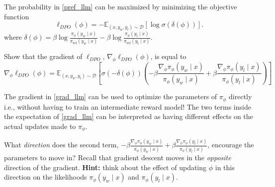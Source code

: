 \documentclass[11pt,addpoints,answers]{exam}
\begin{document}
\begin{questions}
\begin{parts}
\begin{subparts}
    \begin{answer_box}[title=,height=12cm, width=14.5cm]
    \end{answer_box}

\clearpage
    \subpart[3] The probability in \eqref{pref_llm} can be maximized by minimizing the objective function
    \begin{equation}
        \ell_{DPO}(\phi) = -\mathbb{E}_{(x,y_w,y_l)\sim\mathcal{D}}\left[\log \sigma\left(\delta(\phi)\right) \right].
        \label{obj_llm}
    \end{equation}
    where $\delta(\phi) = \beta \log \frac{\pi_{\phi}(y_w \mid x)}{\pi_{\textrm{ref}}(y_w \mid x)} - \beta \log \frac{\pi_{\phi}(y_l \mid x)}{\pi_{\textrm{ref}}(y_l \mid x)}$. 

    Show that the gradient of $\ell_{DPO}$, $\nabla_{\phi} \ell_{DPO}(\phi)$, is equal to
    \begin{equation}
        \nabla_{\phi}\ell_{DPO}(\phi) = \mathbb{E}_{(x,y_w,y_l)\sim\mathcal{D}}\left[\sigma\left(-\delta(\phi)\right)\left(- \beta \frac{\nabla_{\phi}\pi_{\phi}(y_w \mid x)}{\pi_{\phi}(y_w \mid x)} + \beta  \frac{\nabla_{\phi}\pi_{\phi}(y_l \mid x)}{\pi_{\phi}(y_l \mid x)}\right) \right]
        \label{grad_llm}
    \end{equation}
    \begin{answer_box}[title=,height=12cm, width=14.5cm]
    \end{answer_box}

\clearpage
    \subpart The gradient in \eqref{grad_llm} can be used to optimize the parameters of $\pi_{\phi}$ directly i.e., without having to train an intermediate reward model! The two terms inside the expectation of \eqref{grad_llm} can be interpreted as having different effects on the actual updates made to $\pi_{\phi}$. 

    \begin{subsubparts}
        \subsubpart[2] What \emph{direction} does the second term, $- \beta \frac{\nabla_{\phi}\pi_{\phi}(y_w \mid x)}{\pi_{\phi}(y_w \mid x)} + \beta  \frac{\nabla_{\phi}\pi_{\phi}(y_l \mid x)}{\pi_{\phi}(y_l \mid x)}$, encourage the parameters to move in? Recall that gradient descent moves in the \emph{opposite} direction of the gradient. \textbf{Hint:} think about the effect of updating $\phi$ in this direction on the likelihoods $\pi_{\phi}(y_w \mid x)$ and $\pi_{\phi}(y_l \mid x)$.

        \begin{answer_box}[title=,height=6cm, width=14cm]
        \end{answer_box}
        

\end{subsubparts}
\end{subparts}
\end{parts}
\end{questions}
\end{document}
